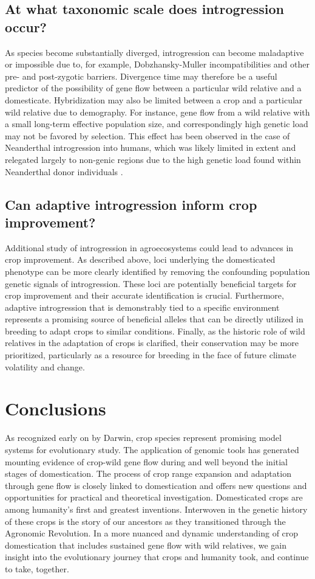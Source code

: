 \documentclass[11pt]{article}
\begin{document}
\subsection*{At what taxonomic scale does introgression occur?}
As species become substantially diverged, introgression can become maladaptive or impossible due to, for example, Dobzhansky-Muller incompatibilities and other pre- and post-zygotic barriers.
Divergence time may therefore be a useful predictor of the possibility of gene flow between a particular wild relative and a domesticate.
Hybridization may also be limited between a crop and a particular wild relative due to demography. 
For instance, gene flow from a wild relative with a small long-term effective population size, and correspondingly high genetic load may not be favored by selection.
This effect has been observed in the case of Neanderthal introgression into humans, which was likely limited in extent and relegated largely to non-genic regions due to the high genetic load found within Neanderthal donor individuals \cite{harris2016genetic}.

\subsection*{Can adaptive introgression inform crop improvement?}

Additional study of introgression in agroecosystems could lead to advances in crop improvement.
As described above, loci underlying the domesticated phenotype can be more clearly identified by removing the confounding population genetic signals of introgression.
These loci are potentially beneficial targets for crop improvement and their accurate identification is crucial.
Furthermore, adaptive introgression that is demonstrably tied to a specific environment represents a promising source of beneficial alleles that can be directly utilized in breeding to adapt crops to similar conditions.
Finally, as the historic role of wild relatives in the adaptation of crops is clarified, their conservation may be more prioritized, particularly as a resource for breeding in the face of future climate volatility and change.

\section*{Conclusions}

As recognized early on by Darwin, crop species represent promising model systems for evolutionary study. 
The application of genomic tools has generated mounting evidence of crop-wild gene flow during and well beyond the initial stages of domestication.
The process of crop range expansion and adaptation through gene flow is closely linked to domestication and offers new questions and opportunities for practical and theoretical investigation.
Domesticated crops are among humanity's first and greatest inventions.
Interwoven in the genetic history of these crops is the story of our ancestors as they transitioned through the Agronomic Revolution.
In a more nuanced and dynamic understanding of crop domestication that includes sustained gene flow with wild relatives, we gain insight into the evolutionary journey that crops and humanity took, and continue to take, together.
\end{document}
